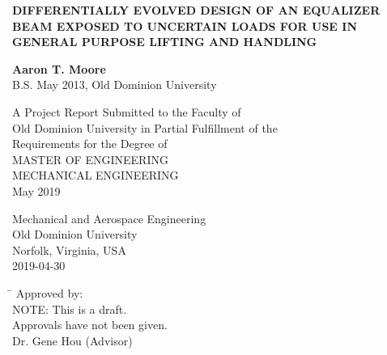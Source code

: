 \begin{titlepage}
   \begin{center}
       \vspace*{1cm}
       
       \Large
	   {\uppercase{\textbf{Differentially Evolved Design of an Equalizer Beam Exposed to Uncertain Loads for use in General Purpose Lifting and Handling}}\par}
       \normalsize

       \vspace{2.5cm}
 
       \textbf{Aaron T. Moore}\\
       B.S. May 2013, Old Dominion University
 
       \vfill
 
       A Project Report Submitted to the Faculty of\\
       Old Dominion University in Partial Fulfillment of the\\
       Requirements for the Degree of\\
       \vspace{1.0cm}
       \uppercase{Master of Engineering}\\
       \vspace{1em}
       \uppercase{Mechanical Engineering}\\
       \vspace{1em}
       {May 2019}\\

 
       \vspace{0.8cm}
 
 
       Mechanical  and Aerospace Engineering\\
       Old Dominion University\\
       Norfolk, Virginia, USA\\
       2019-04-30
 
   \end{center}
   \vspace{1cm}
   \begin{tabbing}
      \hspace*{11cm}\= \kill
      \>Approved by:\\
      \>NOTE: This is a draft.\\
      \>Approvals have not been given.\\
      \>Dr. Gene Hou (Advisor)
   \end{tabbing}
\end{titlepage}
